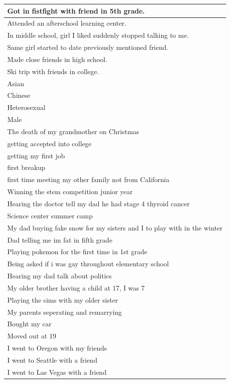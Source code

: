 \documentclass[
  .7em,
  letterpaper,
  DIV=11,
  numbers=noendperiod]{scrartcl}
\begin{document}
\begin{table}
\begin{tabular}{l}
\hline
Got in fistfight with friend in 5th grade.\\
\hline
Attended an afterschool learning center.\\
\hline
In middle school, girl I liked suddenly stopped talking to me.\\
\hline
Same girl started to date previously mentioned friend.\\
\hline
Made close friends in high school.\\
\hline
Ski trip with friends in college.\\
\hline
Asian\\
\hline
Chinese\\
\hline
Heterosexual\\
\hline
Male\\
\hline
The death of my grandmother on Christmas\\
\hline
getting accepted into college\\
\hline
getting my first job\\
\hline
first breakup\\
\hline
first time meeting my other family not from California\\
\hline
Winning the stem competition junior year\\
\hline
Hearing the doctor tell my dad he had stage 4 thyroid cancer\\
\hline
Science center summer camp\\
\hline
My dad buying fake snow for my sisters and I to play with in the winter\\
\hline
Dad telling me im fat in fifth grade\\
\hline
Playing pokemon for the first time in 1st grade\\
\hline
Being asked if i was gay throughout elementary school\\
\hline
Hearing my dad talk about politics\\
\hline
My older brother having a child at 17, I was 7\\
\hline
Playing the sims with my older sister\\
\hline
My parents seperating and remarrying\\
\hline
Bought my car\\
\hline
Moved out at 19\\
\hline
I went to Oregon with my friends\\
\hline
I went to Seattle with a friend\\
\hline
I went to Las Vegas with a friend\\

\end{tabular}
\end{table}
\end{document}
